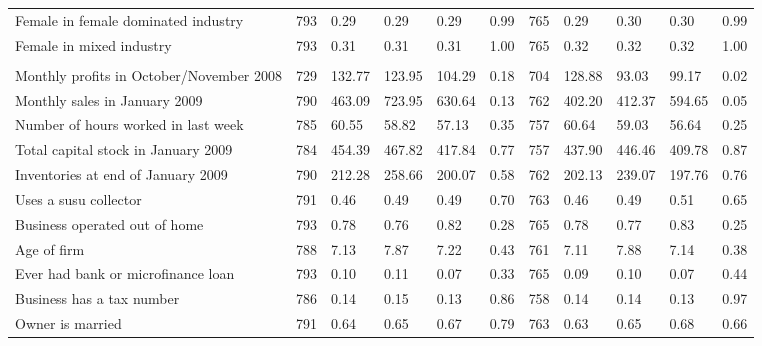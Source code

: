 \documentclass{report}
\begin{document}
\begin{table}[H]
{\begin{tabular}{lllllllllll}
\hspace{1em}Female in female dominated industry & 793 & 0.29 & 0.29 & 0.29 & 0.99 & 765 & 0.29 & 0.30 & 0.30 & 0.99\\
\hspace{1em}Female in mixed industry & 793 & 0.31 & 0.31 & 0.31 & 1.00 & 765 & 0.32 & 0.32 & 0.32 & 1.00\\
\addlinespace[0.3em]
\multicolumn{11}{l}{\textbf{Other variables}}\\
\hspace{1em}Monthly profits in October/November 2008 & 729 & 132.77 & 123.95 & 104.29 & 0.18 & 704 & 128.88 & 93.03 & 99.17 & 0.02\\
\hspace{1em}Monthly sales in January 2009 & 790 & 463.09 & 723.95 & 630.64 & 0.13 & 762 & 402.20 & 412.37 & 594.65 & 0.05\\
\hspace{1em}Number of hours worked in last week & 785 & 60.55 & 58.82 & 57.13 & 0.35 & 757 & 60.64 & 59.03 & 56.64 & 0.25\\
\hspace{1em}Total capital stock in January 2009 & 784 & 454.39 & 467.82 & 417.84 & 0.77 & 757 & 437.90 & 446.46 & 409.78 & 0.87\\
\hspace{1em}Inventories at end of January 2009 & 790 & 212.28 & 258.66 & 200.07 & 0.58 & 762 & 202.13 & 239.07 & 197.76 & 0.76\\
\hspace{1em}Uses a susu collector & 791 & 0.46 & 0.49 & 0.49 & 0.70 & 763 & 0.46 & 0.49 & 0.51 & 0.65\\
\hspace{1em}Business operated out of home & 793 & 0.78 & 0.76 & 0.82 & 0.28 & 765 & 0.78 & 0.77 & 0.83 & 0.25\\
\hspace{1em}Age of firm & 788 & 7.13 & 7.87 & 7.22 & 0.43 & 761 & 7.11 & 7.88 & 7.14 & 0.38\\
\hspace{1em}Ever had bank or microfinance loan & 793 & 0.10 & 0.11 & 0.07 & 0.33 & 765 & 0.09 & 0.10 & 0.07 & 0.44\\
\hspace{1em}Business has a tax number & 786 & 0.14 & 0.15 & 0.13 & 0.86 & 758 & 0.14 & 0.14 & 0.13 & 0.97\\
\hspace{1em}Owner is married & 791 & 0.64 & 0.65 & 0.67 & 0.79 & 763 & 0.63 & 0.65 & 0.68 & 0.66\\

\end{tabular}}
\end{table}
\end{document}
